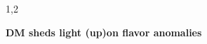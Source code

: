\documentclass[11pt,a4paper,twoside]{article}
\begin{document}
\begin{spacing}{1,2}

%
%


\newcommand{\thetitle}{DM sheds light (up)on flavor anomalies}

\thispagestyle{empty}
\begin{center}

\Huge\textbf{\thetitle}
\vfill
\vfill

\end{center}
\newpage









\setcounter{page}{1}


\end{spacing}
\end{document}
